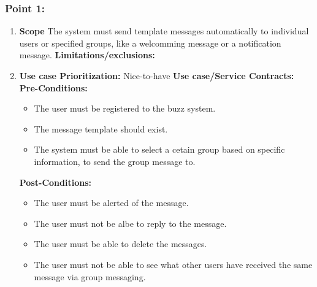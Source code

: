 \documentclass[11pt]{article}
\begin{document}
\subsubsection{Point 1:}
\begin{enumerate}
\item 
\textbf{Scope}
 The system must send template messages automatically to individual users or specified groups, like a welcomming message or a notification message.
\newline
\textbf{Limitations/exclusions:}
\item
\textbf{Use case Prioritization:} Nice-to-have
\textbf{Use case/Service Contracts:} 
\newline
\textbf{Pre-Conditions: }
\begin{itemize}
\item The user must be registered to the buzz system.
\item The message template should exist.
\item The system must be able to select a cetain group based on specific information, to send the group message to.
\end{itemize}
 \textbf{Post-Conditions: }
\begin{itemize}
\item The user must be alerted of the message.
\item The user must not be albe to reply to the message.
\item The user must be able to delete the messages.
\item The user must not be able to see what other users have received the same message via group messaging.
\end{itemize}
\end{enumerate}
\end{document}
